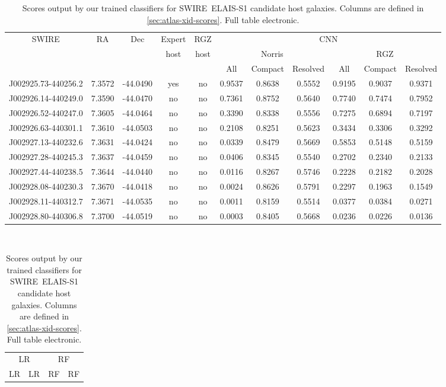   \begin{table}
    \caption[Scores output by our trained classifiers for SWIRE~ELAIS-S1 candidate host galaxies.]{Scores output by our trained classifiers for SWIRE~ELAIS-S1 candidate host galaxies. Columns are defined in \autoref{sec:atlas-xid-scores}. Full table electronic.}
    \label{tab:elais-scores}
    \small\centering
    \begin{tabular}{ccccccccccc}
      \hline\hline
SWIRE & RA & Dec & Expert & RGZ & \multicolumn{6}{c}{CNN} \\
 & & & host & host & \multicolumn{3}{c}{Norris} & \multicolumn{3}{c}{RGZ} \\
 & & & & & All & Compact & Resolved & All & Compact & Resolved \\
      \hline
J002925.73-440256.2 & 7.3572 & -44.0490 & yes & no & 0.9537 & 0.8638 & 0.5552 & 0.9195 & 0.9037 & 0.9371\\
J002926.14-440249.0 & 7.3590 & -44.0470 & no & no & 0.7361 & 0.8752 & 0.5640 & 0.7740 & 0.7474 & 0.7952\\
J002926.52-440247.0 & 7.3605 & -44.0464 & no & no & 0.3390 & 0.8338 & 0.5556 & 0.7275 & 0.6894 & 0.7197\\
J002926.63-440301.1 & 7.3610 & -44.0503 & no & no & 0.2108 & 0.8251 & 0.5623 & 0.3434 & 0.3306 & 0.3292\\
J002927.13-440232.6 & 7.3631 & -44.0424 & no & no & 0.0339 & 0.8479 & 0.5669 & 0.5853 & 0.5148 & 0.5159\\
J002927.28-440245.3 & 7.3637 & -44.0459 & no & no & 0.0406 & 0.8345 & 0.5540 & 0.2702 & 0.2340 & 0.2133\\
J002927.44-440238.5 & 7.3644 & -44.0440 & no & no & 0.0116 & 0.8267 & 0.5746 & 0.2228 & 0.2182 & 0.2028\\
J002928.08-440230.3 & 7.3670 & -44.0418 & no & no & 0.0024 & 0.8626 & 0.5791 & 0.2297 & 0.1963 & 0.1549\\
J002928.11-440312.7 & 7.3671 & -44.0535 & no & no & 0.0011 & 0.8159 & 0.5514 & 0.0377 & 0.0384 & 0.0271\\
J002928.80-440306.8 & 7.3700 & -44.0519 & no & no & 0.0003 & 0.8405 & 0.5668 & 0.0236 & 0.0226 & 0.0136\\
      \hline\hline
    \end{tabular}\\
    \begin{tabular}{cccccccccccc}
      \hline\hline
\multicolumn{6}{c}{LR} & \multicolumn{6}{c}{RF} \\
\multicolumn{3}{c}{LR} & \multicolumn{3}{c}{LR} & \multicolumn{3}{c}{RF} & \multicolumn{3}{c}{RF} \\

\end{tabular}
\end{table}
